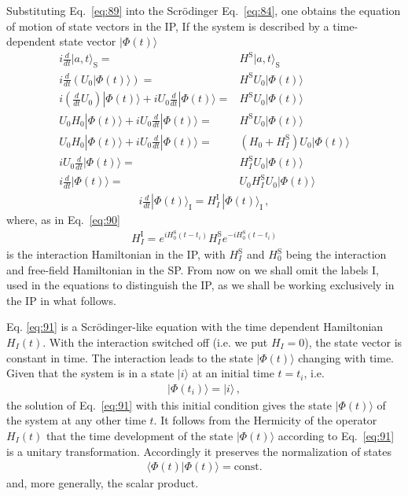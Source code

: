 Substituting Eq.~\eqref{eq:89} into the Scr\"odinger Eq.~\eqref{eq:84}, one obtains the equation of motion of state vectors in the IP, If the system is described by a time-dependent state vector $|\Phi(t)\rangle$
\begin{align}
  i\frac{d}{dt}|a,t\rangle_{\text{S}}=&  H^{\text{S}}|a,t\rangle_{\text{S}}\nonumber\\
  i\frac{d}{dt}\left(U_0|\Phi(t)\rangle\right)=&  H^{\text{S}}U_0|\Phi(t)\rangle\nonumber\\
  i\left(\frac{d}{dt}U_0\right)|\Phi(t)\rangle+iU_0\frac{d}{dt}|\Phi(t)\rangle=&  H^{\text{S}}U_0|\Phi(t)\rangle\nonumber\\
  U_0 H_0|\Phi(t)\rangle+iU_0\frac{d}{dt}|\Phi(t)\rangle=&  H^{\text{S}}U_0|\Phi(t)\rangle\nonumber\\
  U_0 H_0|\Phi(t)\rangle+iU_0\frac{d}{dt}|\Phi(t)\rangle=&  (H_0+H_I^{\text{S}})U_0|\Phi(t)\rangle\nonumber\\
  iU_0\frac{d}{dt}|\Phi(t)\rangle=&  H_I^{\text{S}}U_0|\Phi(t)\rangle\nonumber\\
  i\frac{d}{dt}|\Phi(t)\rangle=& U_0 H_I^{\text{S}}U_0|\Phi(t)\rangle
\end{align}
\begin{align}
\label{eq:91}
  i\frac{d}{d t}|\Phi(t)\rangle_{\text{I}}=H^{\text{I}}_I\,|\Phi(t)\rangle_{\text{I}}\,,
\end{align}
where, as in Eq.~\eqref{eq:90}
\begin{align}
  \label{eq:92}
  H^{\text{I}}_I=e^{i H_0^{{\text{S}}}(t-t_i)}H^{\text{S}}_I e^{-i H_0^{{\text{S}}}(t-t_i)}
\end{align}
is the interaction Hamiltonian in the IP, with $H^{\text{S}}_I$ and $H^{\text{S}}_0$ being the interaction and free-field Hamiltonian in the SP. From now on we shall omit the labels I, used in the equations to distinguish the IP, as we shall be working exclusively in the IP in what follows.

Eq. \eqref{eq:91} is a Scr\"odinger-like equation with the time dependent Hamiltonian $H_I(t)$. With the interaction switched off (i.e.  we put $H_I=0$), the state vector is constant in time. The interaction leads to the state $|\Phi(t)\rangle$ changing with time. Given that the system is in a state  $|i\rangle$ at an initial time $t=t_i$, i.e.
\begin{align}
\label{eq:93}
  |\Phi(t_i)\rangle=|i\rangle\,,
\end{align}
the solution of Eq.~\eqref{eq:91} with this initial condition gives the state $|\Phi(t)\rangle$ of the system at any other time $t$. It follows from the Hermicity of the operator $H_I(t)$ that the time development of the state $|\Phi(t)\rangle$ according to Eq.~\eqref{eq:91} is a unitary transformation. Accordingly it preserves the normalization of states
\begin{align}
  \langle\Phi(t)|\Phi(t)\rangle=\text{const}.
\end{align}
and, more generally, the scalar product.

